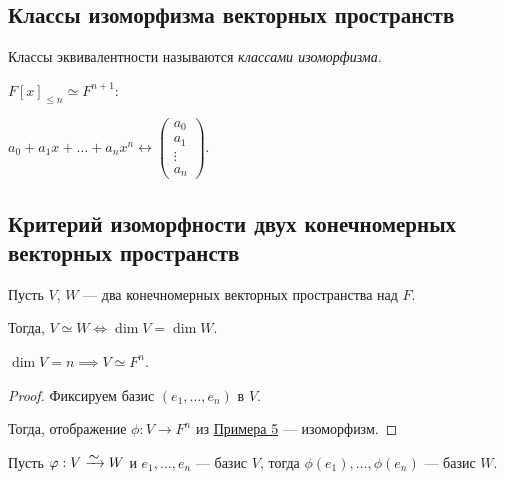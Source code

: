 \subsection{Классы изоморфизма векторных пространств}

\begin{definition}
    Классы эквивалентности называются \textit{классами изоморфизма}.   
\end{definition}

\begin{example}
    $F[x]_{\leq n} \simeq F^{n + 1}$:

    $a_0 + a_1 x + \dots + a_n x^n \longleftrightarrow \begin{pmatrix} a_0 \\ a_1 \\ \vdots \\ a_n \end{pmatrix}$.
\end{example}


\subsection{Критерий изоморфности двух конечномерных векторных пространств}

\begin{theorem}
    Пусть $V$, $W$ --- два конечномерных векторных пространства над $F$.

    Тогда, $V \simeq W \iff \dim V = \dim W$.
\end{theorem}

\begin{lemma}
    \label{lec16:lemma_1}
    $\dim V = n \implies V \simeq F^n$.
\end{lemma}

\begin{proof}
    Фиксируем базис $(e_1, \dots, e_n)$ в $V$.

    Тогда, отображение $\phi : V \to F^n$ из \hyperref[lec16:example_5]{Примера 5} --- изоморфизм.
\end{proof}

\begin{lemma}
    \label{lec16:lemma_2}
    Пусть $\phi : V \MapsTo W$ и $e_1, \dots, e_n$ --- базис $V$, тогда $\phi(e_1), \dots, \phi(e_n)$ --- базис $W$. 
\end{lemma}

